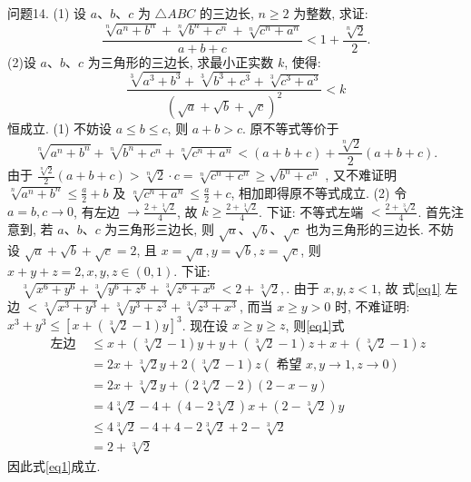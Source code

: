 问题14. (1) 设 $a 、 b 、 c$ 为 $\triangle A B C$ 的三边长, $n \geqslant 2$ 为整数, 求证:
$$
\frac{\sqrt[n]{a^n+b^n}+\sqrt[n]{b^n+c^n}+\sqrt[n]{c^n+a^n}}{a+b+c}<1+\frac{\sqrt[n]{2}}{2} .
$$
(2)设 $a 、 b 、 c$ 为三角形的三边长, 求最小正实数 $k$, 使得:
$$
\frac{\sqrt[3]{a^3+b^3}+\sqrt[3]{b^3+c^3}+\sqrt[3]{c^3+a^3}}{(\sqrt{a}+\sqrt{b}+\sqrt{c})^2}<k
$$
恒成立.
(1) 不妨设 $a \leqslant b \leqslant c$, 则 $a+b>c$. 原不等式等价于
$$
\sqrt[n]{a^n+b^n}+\sqrt[n]{b^n+c^n}+\sqrt[n]{c^n+a^n}<(a+b+c)+\frac{\sqrt[n]{2}}{2}(a+b+c) .
$$
由于 $\frac{\sqrt[n]{2}}{2}(a+b+c)>\sqrt[n]{2} \cdot c=\sqrt[n]{c^n+c^n} \geqslant \sqrt{b^n+c^n}$ ,
又不难证明 $\sqrt[n]{a^n+b^n} \leqslant \frac{a}{2}+b$ 及 $\sqrt[n]{c^n+a^n} \leqslant \frac{a}{2}+c$, 相加即得原不等式成立.
(2) 令 $a=b, c \rightarrow 0$, 有左边 $\rightarrow \frac{2+\sqrt[3]{2}}{4}$, 故 $k \geqslant \frac{2+\sqrt[3]{2}}{4}$.
下证: 不等式左端 $<\frac{2+\sqrt[3]{2}}{4}$.
首先注意到, 若 $a 、 b 、 c$ 为三角形三边长, 则 $\sqrt{a} 、 \sqrt{b} 、 \sqrt{c}$ 也为三角形的三边长.
不妨设 $\sqrt{a}+\sqrt{b}+\sqrt{c}=2$, 且 $x=\sqrt{a}, y=\sqrt{b}, z=\sqrt{c}$, 则 $x+y+z= 2, x, y, z \in(0,1)$.
下证: $\quad \sqrt[3]{x^6+y^6}+\sqrt[3]{y^6+z^6}+\sqrt[3]{z^6+x^6}<2+\sqrt[3]{2}, \label{eq1}$.
由于 $x, y, z<1$, 故 式\ref{eq1} 左边 $<\sqrt[3]{x^3+y^3}+\sqrt[3]{y^3+z^3}+\sqrt[3]{z^3+x^3}$, 而当 $x \geqslant y>0$ 时, 不难证明: $x^3+y^3 \leqslant[x+(\sqrt[3]{2}-1) y]^3$.
现在设 $x \geqslant y \geqslant z$, 则\ref{eq1}式
$$
\begin{aligned}
\text { 左边 } & \leqslant x+(\sqrt[3]{2}-1) y+y+(\sqrt[3]{2}-1) z+x+(\sqrt[3]{2}-1) z \\
& =2 x+\sqrt[3]{2} y+2(\sqrt[3]{2}-1) z(\text { 希望 } x, y \rightarrow 1, z \rightarrow 0) \\
& =2 x+\sqrt[3]{2} y+(2 \sqrt[3]{2}-2)(2-x-y) \\
& =4 \sqrt[3]{2}-4+(4-2 \sqrt[3]{2}) x+(2-\sqrt[3]{2}) y \\
& \leqslant 4 \sqrt[3]{2}-4+4-2 \sqrt[3]{2}+2-\sqrt[3]{2} \\
& =2+\sqrt[3]{2}
\end{aligned}
$$
因此式\ref{eq1}成立.


